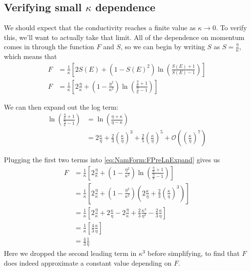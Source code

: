 \documentclass[../../main.tex]{subfiles}
\begin{document}
\subsection{Verifying small $\kappa$ dependence} \label{subsec:NamForm.SmallK}
We should expect that the conductivity reaches a finite value as $\kappa \rightarrow 0$. To verify this, we'll want to actually take that limit. All of the dependence on momentum comes in through the function $F$ and $S$, so we can begin by writing $S$ as $S = \frac{\eta}{\kappa}$, which means that
\begin{align}
	F &= \frac{1}{\kappa} \left[2 S(E) + (1 - S(E)^2)\ln(\frac{S(E) + 1}{S(E) - 1})\right] \\
	F &= \frac{1}{\kappa} \left[2 \frac{\eta}{\kappa} + (1 - \frac{\eta^2}{\kappa^2})\ln(\frac{\frac{\eta}{\kappa} + 1}{\frac{\eta}{\kappa} - 1})\right] \label{eq:NamForm:FPreLnExpand}
\end{align}

We can then expand out the log term:
\begin{align}
	\ln(\frac{\frac{\eta}{\kappa} + 1}{\frac{\eta}{\kappa} - 1}) &= \ln(\frac{\eta + \kappa}{\eta - \kappa}) \\
	&= 2 \frac{\kappa}{\eta} + \frac23 \left(\frac{\kappa}{\eta}\right)^3 + \frac25 \left(\frac{\kappa}{\eta}\right)^5 + \mathcal{O}\left(\left(\frac{\kappa}{\eta}\right)^7\right)
\end{align}

Plugging the first two terms into \eqref{eq:NamForm:FPreLnExpand} gives us
\begin{align}
	F &= \frac{1}{\kappa} \left[2 \frac{\eta}{\kappa} + (1 - \frac{\eta^2}{\kappa^2})\ln(\frac{\frac{\eta}{\kappa} + 1}{\frac{\eta}{\kappa} - 1})\right] \\
	&= \frac{1}{\kappa} \left[2 \frac{\eta}{\kappa} + (1 - \frac{\eta^2}{\kappa^2})\left(2 \frac{\kappa}{\eta} + \frac23 \left(\frac{\kappa}{\eta}\right)^3\right)\right] \\
	&= \frac{1}{\kappa} \left[2 \frac{\eta}{\kappa} + 2\frac{\kappa}{\eta} - 2 \frac{\eta}{\kappa} + \frac23 \frac{\kappa^3}{\eta^3} - \frac23 \frac{\kappa}{\eta}\right] \\
	&= \frac{1}{\kappa} \left[\frac43\frac{\kappa}{\eta}\right] \\
	&= \frac43 \frac{1}{\eta}
\end{align}
Here we dropped the second leading term in $\kappa^3$ before simplifying, to find that $F$ does indeed approximate a constant value depending on $F$.
\end{document}

